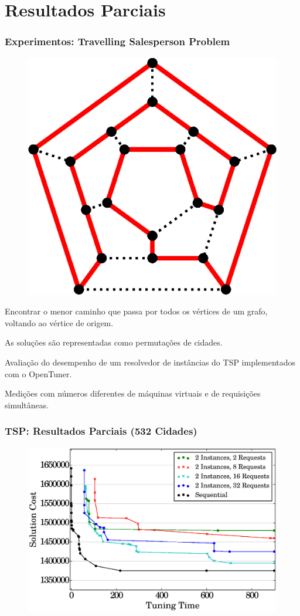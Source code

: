\documentclass[10pt, compress]{beamer}
\begin{document}
\section{Resultados Parciais}

\begin{frame}[fragile]
    \frametitle{Experimentos: Travelling Salesperson Problem}
    \begin{figure}[H]
        \centering
        \includegraphics[width=.33\textwidth]{hamiltonianpath}
    \end{figure}%
    Encontrar o \alert{menor caminho} que passa por todos os vértices de um
    grafo, \alert{voltando ao vértice de origem}.

    As soluções são representadas como \alert{permutações} de cidades.

    \alert{Avaliação do desempenho} de um resolvedor de
    instâncias do TSP implementados com o OpenTuner. 

    Medições com números diferentes de \alert{máquinas virtuais} e de
    \alert{requisições simultâneas}.
\end{frame}

\begin{frame}[fragile]
 \frametitle{TSP: Resultados Parciais (532 Cidades)}
  \begin{figure}[H]
      \centering
      \includegraphics[width=.9\textwidth]{i2_p_n_comparison}
  \end{figure}
\end{frame}
\end{document}
